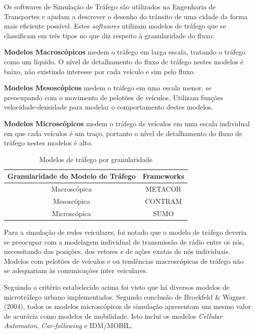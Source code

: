 \documentclass[
12pt,				%
openright,			%
oneside,			%
a4paper,			%
brazil,				%
]{abntex2}
\begin{document}
	\par Os softwares de Simulação de Tráfego são utilizados na Engenharia de Transportes e ajudam a descrever o desenho do trânsito de uma cidade da forma mais eficiente possível. Estes \textit{softwares} utilizam modelos de tráfego que se classificam em três tipos no que diz respeito à granularidade do fluxo:
	
	\par \textbf{Modelos Macroscópicos} medem o tráfego em larga escala, tratando o tráfego como um líquido. O nível de detalhamento do fluxo de tráfego nestes modelos é baixo, não existindo interesse por cada veículo e sim pelo fluxo.
	
	\par \textbf{Modelos Mesoscópicos} medem o tráfego em uma escala menor, se preocupando com o movimento de pelotões de veículos. Utilizam funções velocidade-densidade para modelar o comportamento destes modelos. 
	
	\par \textbf{Modelos Microscópicos} medem o tráfego de veículos em uma escala individual em que cada veículos é um traço, portanto o nível de detalhamento do fluxo de tráfego nestes modelos é alto.
		
	\begin{table}[H]
		\centering
		\renewcommand{\arraystretch}{1.5}
		\label{tab_6}
		\begin{tabular}{|c|c|}
			\hline
			\textbf{Granularidade do Modelo de Tráfego} & \textbf{Frameworks} \\ \hline
			Macroscópica & METACOR \\ \hline
			Mesoscópica & CONTRAM \\ \hline
			Microscópica & SUMO \\ \hline
		\end{tabular}
		\caption{Modelos de tráfego por granularidade}
	\end{table}
	
	\par Para a simulação de redes veiculares, foi notado que o modelo de tráfego deveria se preocupar com a modelagem individual de transmissão de rádio entre os nós, necessitando das posições, dos vetores e de ações exatas de nós individuais. Modelos com pelotões de veículos e ou tendências macroscópicas de tráfego não se adequariam às  comunicações inter veiculares. 
	
	\par Seguindo o critério estabelecido acima foi visto que há diversos modelos de microtráfego urbano implementados. Segundo conclusão de Brockfeld \& Wagner (2004), todos os modelos microscópicos de simulação apresentam um mesmo valor de acurácia como modelos de mobilidade. Isto inclui os modelos \textit{Cellular Automaton}, \textit{Car-following} e IDM/MOBIL.
	
\end{document}
